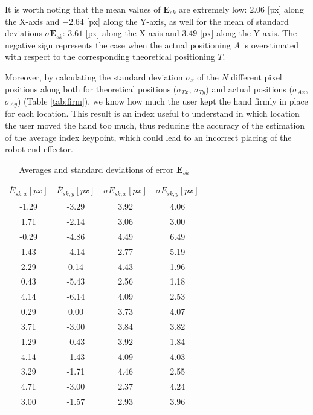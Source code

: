 \documentclass[a4paper, 10 pt, conference]{ieeeconf}      %
\begin{document}
It is worth noting that the mean values of $\overline{\mathbf{E}}_{sk}$ are extremely low: $2.06$ [px] along the X-axis and $-2.64$ [px] along the Y-axis, as well for the mean of standard deviations $\sigma{\mathbf{E}}_{sk}$: $3.61$ [px] along the X-axis and $3.49$ [px] along the Y-axis. The negative sign represents the case when the actual positioning $A$ is overstimated with respect to the corresponding theoretical positioning $T$.

Moreover, by calculating the standard deviation $\sigma_x$ of the $N$ different pixel positions along both for theoretical positions ($\sigma_{Tx}$, $\sigma_{Ty}$) and actual positions ($\sigma_{Ax}$, $\sigma_{Ay}$) (Table \ref{tab:firm}), we know how much the user kept the hand firmly in place for each location. This result is an index useful to understand in which location the user moved the hand too much, thus reducing the accuracy of the estimation of the average index keypoint, which could lead to an incorrect placing of the robot end-effector.

\begin{table}[h]
\begin{center}
\caption{Averages and standard deviations of error $\mathbf{E}_{sk}$}
\label{tab:dev}
\begin{tabular}{|c||c||c||c|}
\hline
$\overline{E}_{sk,x} [px]$ & $\overline{E}_{sk,y} [px]$ & $\sigma{E}_{sk,x} [px]$ & $\sigma{E}_{sk,y} [px]$\\
\hline
-1.29	&	-3.29	&	3.92	&	4.06	\\
1.71	&	-2.14	&	3.06	&	3.00	\\
-0.29	&	-4.86	&	4.49	&	6.49	\\
1.43	&	-4.14	&	2.77	&	5.19	\\
2.29	&	0.14	&	4.43	&	1.96	\\
0.43	&	-5.43	&	2.56	&	1.18	\\
4.14	&	-6.14	&	4.09	&	2.53	\\
0.29	&	0.00	&	3.73	&	4.07	\\
3.71	&	-3.00	&	3.84	&	3.82	\\
1.29	&	-0.43	&	3.92	&	1.84	\\
4.14	&	-1.43	&	4.09	&	4.03	\\
3.29	&	-1.71	&	4.46	&	2.55	\\
4.71	&	-3.00	&	2.37	&	4.24	\\
3.00	&	-1.57	&	2.93	&	3.96	\\
\hline
\end{tabular}
\end{center}
\end{table}
\end{document}
